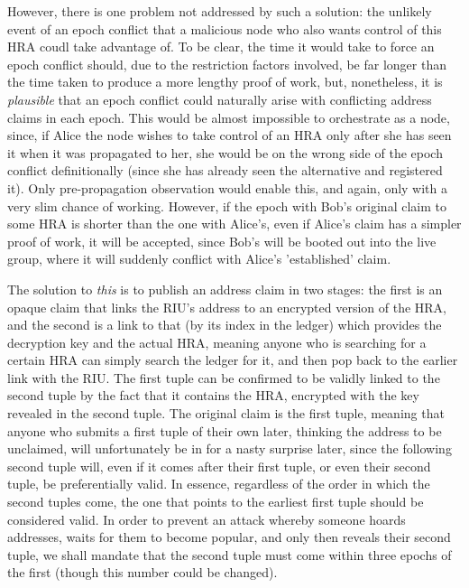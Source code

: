\documentclass{extreport}
\begin{document}
However, there is one problem not addressed by such a solution: the unlikely event of an epoch conflict that a malicious node who also wants control of this HRA coudl take advantage of. To be clear, the time it would take to force an epoch conflict should, due to the restriction factors involved, be far longer than the time taken to produce a more lengthy proof of work, but, nonetheless, it is \emph{plausible} that an epoch conflict could naturally arise with conflicting address claims in each epoch. This would be almost impossible to orchestrate as a node, since, if Alice the node wishes to take control of an HRA only after she has seen it when it was propagated to her, she would be on the wrong side of the epoch conflict definitionally (since she has already seen the alternative and registered it). Only pre-propagation observation would enable this, and again, only with a very slim chance of working. However, if the epoch with Bob's original claim to some HRA is shorter than the one with Alice's, even if Alice's claim has a simpler proof of work, it will be accepted, since Bob's will be booted out into the live group, where it will suddenly conflict with Alice's 'established' claim.

The solution to \emph{this} is to publish an address claim in two stages: the first is an opaque claim that links the RIU's address to an encrypted version of the HRA, and the second is a link to that (by its index in the ledger) which provides the decryption key and the actual HRA, meaning anyone who is searching for a certain HRA can simply search the ledger for it, and then pop back to the earlier link with the RIU. The first tuple can be confirmed to be validly linked to the second tuple by the fact that it contains the HRA, encrypted with the key revealed in the second tuple. The original claim is the first tuple, meaning that anyone who submits a first tuple of their own later, thinking the address to be unclaimed, will unfortunately be in for a nasty surprise later, since the following second tuple will, even if it comes after their first tuple, or even their second tuple, be preferentially valid. In essence, regardless of the order in which the second tuples come, the one that points to the earliest first tuple should be considered valid. In order to prevent an attack whereby someone hoards addresses, waits for them to become popular, and only then reveals their second tuple, we shall mandate that the second tuple must come within three epochs of the first (though this number could be changed).
\end{document}
